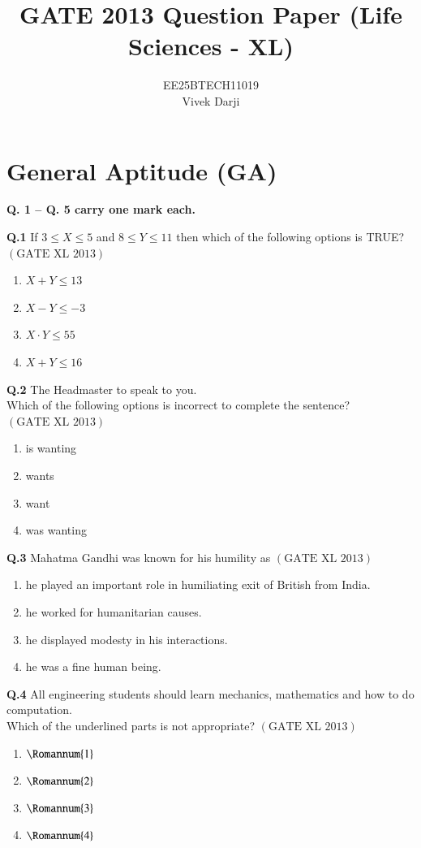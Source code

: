 \documentclass[12pt]{article}
\title{GATE 2013 Question Paper (Life Sciences - XL)}
\author{EE25BTECH11019 \\ Vivek Darji}
\date{}
\theoremstyle{remark}
\providecommand{\brak}[1]{\ensuremath{\left(#1\right)}}
\begin{document}
\maketitle

\section*{General Aptitude (GA)}
\noindent\textbf{Q. 1 – Q. 5 carry one mark each.} 

\textbf{Q.1}  
If $3 \leq X \leq 5$ and $8 \leq Y \leq 11$ then which of the following options is TRUE? \hfill $\brak{\text{GATE XL 2013}}$
\begin{enumerate}
    \item $X + Y \leq 13$
    \item $X - Y \leq -3$
    \item $X \cdot Y \leq 55$
    \item $X + Y \leq 16$
\end{enumerate}

\textbf{Q.2}  
The Headmaster \underline{\hspace{3cm}} to speak to you.\\
Which of the following options is incorrect to complete the sentence? \hfill $\brak{\text{GATE XL 2013}}$
\begin{enumerate}
    \item is wanting
    \item wants
    \item want
    \item was wanting
\end{enumerate}

\textbf{Q.3}  
Mahatma Gandhi was known for his humility as \hfill $\brak{\text{GATE XL 2013}}$
\begin{enumerate}
    \item he played an important role in humiliating exit of British from India.
    \item he worked for humanitarian causes.
    \item he displayed modesty in his interactions.
    \item he was a fine human being.
\end{enumerate}

\textbf{Q.4}  
All engineering students should learn mechanics, mathematics and how to do computation.\\
Which of the underlined parts is not appropriate? \hfill $\brak{\text{GATE XL 2013}}$
\begin{enumerate}
    \item $\Romannum{1}$
    \item $\Romannum{2}$
    \item $\Romannum{3}$
    \item $\Romannum{4}$
\end{enumerate}
\end{document}
